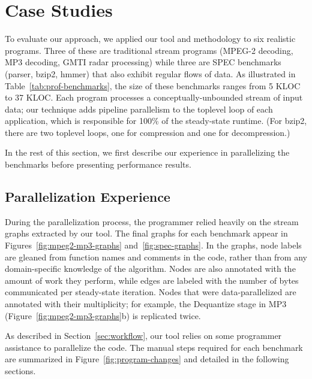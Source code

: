 
\section{Case Studies}
\label{sec:results}

To evaluate our approach, we applied our tool and methodology to six
realistic programs.  Three of these are traditional stream programs
(MPEG-2 decoding, MP3 decoding, GMTI radar processing) while three are
SPEC benchmarks (parser, bzip2, hmmer) that also exhibit regular flows
of data.  As illustrated in Table~\ref{tab:prof-benchmarks}, the size of
these benchmarks ranges from 5 KLOC to 37 KLOC.  Each program
processes a conceptually-unbounded stream of input data; our technique
adds pipeline parallelism to the toplevel loop of each application,
which is responsible for 100\% of the steady-state runtime.  (For
bzip2, there are two toplevel loops, one for compression and one for
decompression.)

In the rest of this section, we first describe our experience in
parallelizing the benchmarks before presenting performance results.

\subsection*{Parallelization Experience}

During the parallelization process, the programmer relied heavily on
the stream graphs extracted by our tool.  The final graphs for each
benchmark appear in Figures~\ref{fig:mpeg2-mp3-graphs}
and~\ref{fig:spec-graphs}.  In the graphs, node labels are gleaned
from function names and comments in the code, rather than from any
domain-specific knowledge of the algorithm.  Nodes are also annotated
with the amount of work they perform, while edges are labeled with the
number of bytes communicated per steady-state iteration.  Nodes that
were data-parallelized are annotated with their multiplicity; for
example, the Dequantize stage in MP3
(Figure~\ref{fig:mpeg2-mp3-graphs}b) is replicated twice.

As described in Section~\ref{sec:workflow}, our tool relies on some
programmer assistance to parallelize the code.  The manual steps
required for each benchmark are summarized in
Figure~\ref{fig:program-changes} and detailed in the following
sections.

